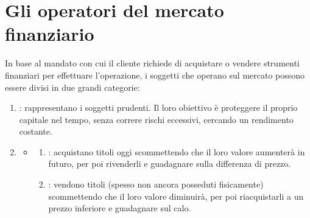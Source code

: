 \documentclass[letterpaper,10pt,italian]{sphinxmanual}
\begin{document}
\sphinxstepscope


\chapter{Gli operatori del mercato finanziario}
\label{\detokenize{Gli operatori del mercato finanziario:gli-operatori-del-mercato-finanziario}}\label{\detokenize{Gli operatori del mercato finanziario::doc}}
\sphinxAtStartPar
In base al mandato con cui il cliente richiede di acquistare o vendere strumenti finanziari per effettuare l’operazione, i soggetti che operano sul mercato possono essere divisi in due grandi categorie:
\begin{enumerate}
%
\item {} 
\sphinxAtStartPar
{}: rappresentano i soggetti prudenti. Il loro obiettivo è proteggere il proprio capitale nel tempo, senza correre rischi eccessivi, cercando un rendimento costante.

\item {} \begin{description}
\begin{itemize}
\item {} \begin{description}
\begin{enumerate}
%
\item {} 
\sphinxAtStartPar
{}: acquistano titoli oggi scommettendo che il loro valore aumenterà in futuro, per poi rivenderli e guadagnare sulla differenza di prezzo.

\item {} 
\sphinxAtStartPar
{}: vendono titoli (spesso non ancora posseduti fisicamente) scommettendo che il loro valore diminuirà, per poi riacquistarli a un prezzo inferiore e guadagnare sul calo.

\end{enumerate}

\end{description}

\end{itemize}

\end{description}

\end{enumerate}
\end{document}

